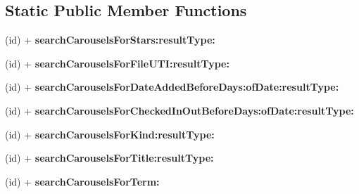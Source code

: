 \subsection*{Static Public Member Functions}
\begin{DoxyCompactItemize}
\item 
\hypertarget{interface_p_a_d_search_request_a5a7ede86983d26f46e158d7a271a7127}{
(id) + {\bfseries searchCarouselsForStars:resultType:}}
\label{interface_p_a_d_search_request_a5a7ede86983d26f46e158d7a271a7127}

\item 
\hypertarget{interface_p_a_d_search_request_a6783ebbf86246a870cee0b97f4169ab0}{
(id) + {\bfseries searchCarouselsForFileUTI:resultType:}}
\label{interface_p_a_d_search_request_a6783ebbf86246a870cee0b97f4169ab0}

\item 
\hypertarget{interface_p_a_d_search_request_a2632a4dfa98cdadfabb155774c28c815}{
(id) + {\bfseries searchCarouselsForDateAddedBeforeDays:ofDate:resultType:}}
\label{interface_p_a_d_search_request_a2632a4dfa98cdadfabb155774c28c815}

\item 
\hypertarget{interface_p_a_d_search_request_abefcb9e9036957bdcf7340d3abdbb34a}{
(id) + {\bfseries searchCarouselsForCheckedInOutBeforeDays:ofDate:resultType:}}
\label{interface_p_a_d_search_request_abefcb9e9036957bdcf7340d3abdbb34a}

\item 
\hypertarget{interface_p_a_d_search_request_a64df2efa033335b14a6bcac99c749b22}{
(id) + {\bfseries searchCarouselsForKind:resultType:}}
\label{interface_p_a_d_search_request_a64df2efa033335b14a6bcac99c749b22}

\item 
\hypertarget{interface_p_a_d_search_request_a604066f43bc5824c034518cd56c600fc}{
(id) + {\bfseries searchCarouselsForTitle:resultType:}}
\label{interface_p_a_d_search_request_a604066f43bc5824c034518cd56c600fc}

\item 
\hypertarget{interface_p_a_d_search_request_ac954f195881be848c46f985f9f84f895}{
(id) + {\bfseries searchCarouselsForTerm:}}
\label{interface_p_a_d_search_request_ac954f195881be848c46f985f9f84f895}

\end{DoxyCompactItemize}
